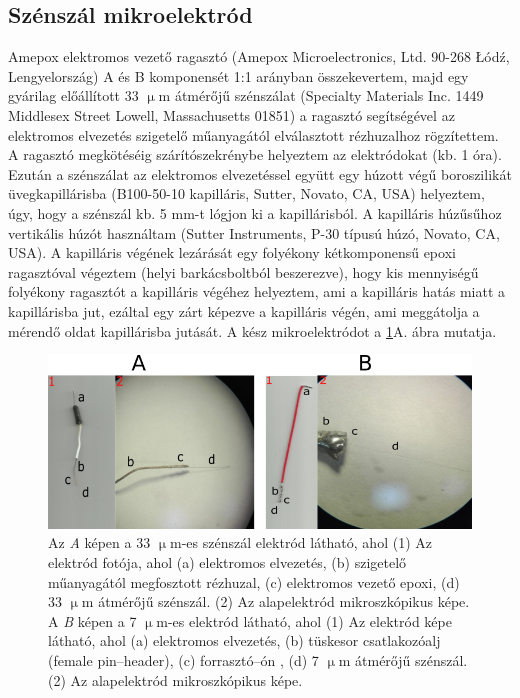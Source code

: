 \subsection{Szénszál mikroelektród}
Amepox elektromos vezető ragasztó (Amepox Microelectronics, Ltd. 90-268 Łódź, Lengyelország) A és B komponensét 1:1 arányban összekevertem, majd egy gyárilag előállított 33 $\upmu$m átmérőjű szénszálat (Specialty Materials Inc. 1449 Middlesex Street Lowell, Massachusetts 01851) a ragasztó segítségével az elektromos elvezetés szigetelő műanyagától elválasztott rézhuzalhoz rögzítettem. A ragasztó megkötéséig szárítószekrénybe helyeztem az elektródokat (kb. 1 óra). Ezután a szénszálat az elektromos elvezetéssel együtt egy húzott végű boroszilikát üvegkapillárisba (B100-50-10 kapilláris, Sutter, Novato, CA, USA) helyeztem, úgy, hogy a szénszál kb. 5 mm-t lógjon ki a kapillárisból. A kapilláris húzűsűhoz vertikális húzót használtam (Sutter Instruments, P-30 típusú húzó, Novato, CA, USA). A kapilláris végének lezárását egy folyékony kétkomponensű epoxi ragasztóval végeztem (helyi barkácsboltból beszerezve), hogy kis mennyiségű folyékony ragasztót a kapilláris végéhez helyeztem, ami a kapilláris hatás miatt a kapillárisba jut, ezáltal egy zárt képezve a kapilláris végén, ami meggátolja a mérendő oldat kapillárisba jutását. A kész mikroelektródot a \ref{fig:szen}A. ábra mutatja.
\begin{figure}
\centering
\includegraphics[width=1\textwidth]{img/szen.png}
\caption{ Az \emph{A} képen a 33 $\upmu$m-es szénszál elektród látható, ahol (1) Az elektród fotója, ahol (a) elektromos elvezetés, (b) szigetelő műanyagától megfosztott rézhuzal, (c) elektromos vezető epoxi, (d) 33 $\upmu$m átmérőjű szénszál. (2) Az alapelektród mikroszkópikus képe. A \emph{B} képen a 7 $\upmu$m-es elektród látható, ahol (1) Az elektród képe látható, ahol (a) elektromos elvezetés, (b) tüskesor csatlakozóalj (female pin--header), (c) forrasztó--ón , (d) 7 $\upmu$m átmérőjű szénszál. (2) Az alapelektród mikroszkópikus képe.}
\label{fig:szen}
\end{figure}

